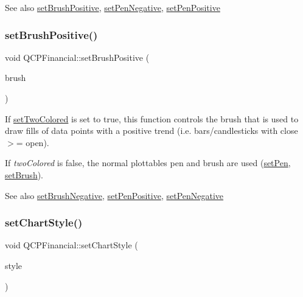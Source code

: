 \begin{DoxySeeAlso}{See also}
\mbox{\hyperlink{class_q_c_p_financial_a5ebff2b1764efd07cc44942e67821829}{set\+Brush\+Positive}}, \mbox{\hyperlink{class_q_c_p_financial_afe5c07e94ccea01a75b3a2476993c346}{set\+Pen\+Negative}}, \mbox{\hyperlink{class_q_c_p_financial_ac58aa3adc7a35aab0088764b840683e5}{set\+Pen\+Positive}} 
\end{DoxySeeAlso}
\mbox{\label{class_q_c_p_financial_a5ebff2b1764efd07cc44942e67821829}} 
\subsubsection{\texorpdfstring{setBrushPositive()}{setBrushPositive()}}
{\footnotesize\ttfamily void Q\+C\+P\+Financial\+::set\+Brush\+Positive (\begin{DoxyParamCaption}\item[{const Q\+Brush \&}]{brush }\end{DoxyParamCaption})}

If \mbox{\hyperlink{class_q_c_p_financial_a138e44aac160a17a9676652e240c5f08}{set\+Two\+Colored}} is set to true, this function controls the brush that is used to draw fills of data points with a positive trend (i.\+e. bars/candlesticks with close $>$= open).

If {\itshape two\+Colored} is false, the normal plottable\textquotesingle{}s pen and brush are used (\mbox{\hyperlink{class_q_c_p_abstract_plottable_ab74b09ae4c0e7e13142fe4b5bf46cac7}{set\+Pen}}, \mbox{\hyperlink{class_q_c_p_abstract_plottable_a7a4b92144dca6453a1f0f210e27edc74}{set\+Brush}}).

\begin{DoxySeeAlso}{See also}
\mbox{\hyperlink{class_q_c_p_financial_a8bbdd87629f9144b3ef51af660c0961a}{set\+Brush\+Negative}}, \mbox{\hyperlink{class_q_c_p_financial_ac58aa3adc7a35aab0088764b840683e5}{set\+Pen\+Positive}}, \mbox{\hyperlink{class_q_c_p_financial_afe5c07e94ccea01a75b3a2476993c346}{set\+Pen\+Negative}} 
\end{DoxySeeAlso}
\mbox{\label{class_q_c_p_financial_a5a59175d36279d71596e64d7bb65596f}} 
\subsubsection{\texorpdfstring{setChartStyle()}{setChartStyle()}}
{\footnotesize\ttfamily void Q\+C\+P\+Financial\+::set\+Chart\+Style (\begin{DoxyParamCaption}\item[{\mbox{\hyperlink{class_q_c_p_financial_a0f800e21ee98d646dfc6f8f89d10ebfb}{Q\+C\+P\+Financial\+::\+Chart\+Style}}}]{style }\end{DoxyParamCaption})}

